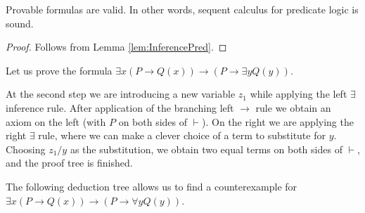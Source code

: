 \begin{page}

\begin{thm}
Provable formulas are valid.
In other words, sequent calculus for predicate logic is sound.
\end{thm}

\end{page}

\begin{page}

\begin{proof}
Follows from Lemma \ref{lem:InferencePred}.
\end{proof}



\end{page}

\begin{page}

\begin{exl}
Let us prove the formula $\exists x(P \to Q(x)) \to (P \to \exists y Q(y))$.
\begin{prooftree}
\end{prooftree}

At the second step we are introducing a new variable $z_1$ while applying the left $\exists$ inference rule.
After application of the branching left $\to$ rule we obtain an axiom on the left (with $P$ on both sides of $\vdash$).
On the right we are applying the right $\exists$ rule, where we can make a clever choice of a term to substitute for $y$.
Choosing $z_1/y$ as the substitution, we obtain two equal terms on both sides of $\vdash$, and the proof tree is finished.
\end{exl}

\end{page}

\begin{page}

\begin{exl}
\label{exl:CounterexamplePred}
The following deduction tree allows us to find a counterexample for $\exists x(P \to Q(x)) \to (P \to \forall y Q(y))$.
\begin{prooftree}
\end{prooftree}
\end{exl}

\end{page}

